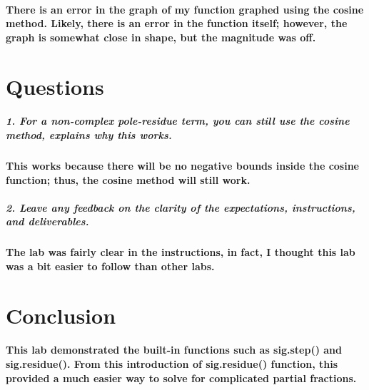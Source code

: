 \documentclass[12pt,a4paper]{article}
\begin{document}
\paragraph{There is an error in the graph of my function graphed using the cosine method. Likely, there is an error in the function itself; however, the graph is somewhat close in shape, but the magnitude was off.}

\section{Questions}\label{sec:res}
\subparagraph{\Large 1. For a non-complex pole-residue term, you can still use the cosine method, explains why this works.}

\paragraph{This works because there will be no negative bounds inside the cosine function; thus, the cosine method will still work.}

\subparagraph{\Large 2. Leave any feedback on the clarity of the expectations, instructions, and deliverables.}
\paragraph{The lab was fairly clear in the instructions, in fact, I thought this lab was a bit easier to follow than other labs.}

\section{Conclusion}\label{sec:res}

\paragraph{This lab demonstrated the built-in functions such as sig.step() and sig.residue(). From this introduction of sig.residue() function, this provided a much easier way to solve for complicated partial fractions.}






\end{document}
